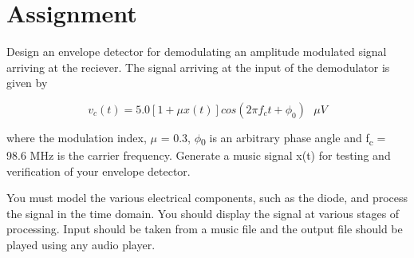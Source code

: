 \section{Assignment}

Design an envelope detector for demodulating an amplitude modulated signal arriving at the reciever. The signal arriving at the input of the demodulator is given by 

\begin{equation}
    v_c(t) = 5.0[1+\mu x(t)]cos(2\pi f_ct+\phi_0) \ \ \ \mu V
\end{equation}

where the modulation index, $\mu$ = 0.3, $\phi$\textsubscript{0} is an arbitrary phase angle and f\textsubscript{c} = 98.6 MHz is the carrier frequency. Generate a music signal x(t) for testing and verification of your envelope detector.

You must model the various electrical components, such as the diode, and process the signal in the time domain. You should display the signal at various stages of processing. Input should be taken from a music file and the output file should be played using any audio player.